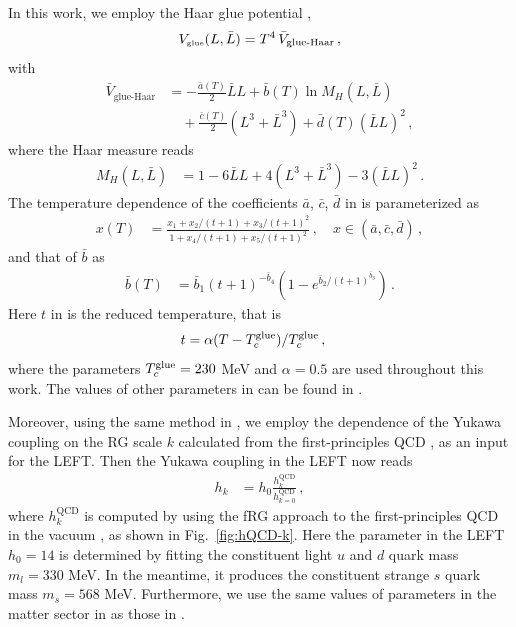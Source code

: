 \documentclass[aps,twocolumn,prd,superscriptaddress,nofootinbib,floatfix]{revtex4-2}
\begin{document}
In this work, we employ the Haar glue potential \cite{Lo:2013hla, Wen:2018nkn}, 
\begin{align}
    V_{\text{\tiny{glue}}}(L, \bar L)=T^4 \,\bar V_{\text{glue-Haar}}\,,\label{eq:Vglue}
\end{align}
with
\begin{align}
    \bar V_{\text{glue-Haar}} &= -\frac{\bar a(T)}{2} \bar L L + \bar b(T)\ln M_H(L,\bar{L})\nonumber\\[2ex]
    &\quad+ \frac{\bar c(T)}{2} (L^3+\bar L^3) + \bar d(T) (\bar{L} L)^2\,,\label{eq:GluepHaar}
\end{align}
where the Haar measure reads
\begin{align}
    M_H (L, \bar{L})&= 1 -6 \bar{L}L + 4 (L^3+\bar{L}^3) - 3  (\bar{L}L)^2\,.
\end{align}
The temperature dependence of the coefficients $\bar a$, $\bar c$, $\bar d$ in  is parameterized as
\begin{align}
    x(T) &= \frac{x_1 + x_2/(t+1) + x_3/(t+1)^2}{1 + x_4/(t+1) + x_5/(t+1)^2}\,,\quad x\in (\bar a, \bar c, \bar d)\,,\label{eq:xT}
\end{align}
and that of $\bar b$ as
\begin{align}
    \bar b(T) &=\bar b_1 (t+1)^{-\bar b_4}\left (1 -e^{\bar b_2/(t+1)^{\bar b_3}} \right)\,.\label{eq:bT}
\end{align}
Here $t$ in  is the reduced temperature, that is
\begin{align}
    t&=\alpha (T-T_c^\mathrm{\tiny{glue}})/T_c^\mathrm{\tiny{glue}}\,,\label{}
\end{align}
where the parameters $T_c^\mathrm{\tiny{glue}}=230$ MeV and $\alpha=0.5$ are used throughout this work. The values of other parameters in  can be found in \cite{Lo:2013hla, Wen:2018nkn}.

Moreover, using the same method in \cite{Fu:2023lcm}, we employ the dependence of the Yukawa coupling on the RG scale $k$ calculated from the first-principles QCD \cite{Fu:2019hdw}, as an input for the LEFT. Then the Yukawa coupling in the LEFT now reads
\begin{align}
    h_k&=h_0 \frac{h_{k}^{\mathrm{QCD}}}{h_{k=0}^{\mathrm{QCD}}}\,,\label{eq:hk}
\end{align}
where $h_{k}^{\mathrm{QCD}}$ is computed by using the fRG approach to the first-principles QCD in the vacuum \cite{Fu:2019hdw}, as shown in Fig.~\ref{fig:hQCD-k}. Here the parameter in the LEFT $h_0=14$ is determined by fitting the constituent light $u$ and $d$ quark mass $m_l=330$ MeV. In the meantime, it produces the constituent strange $s$ quark mass $m_s=568$ MeV.  Furthermore, we use the same values of parameters in the matter sector in  as those in \cite{Wen:2018nkn}.
\end{document}
